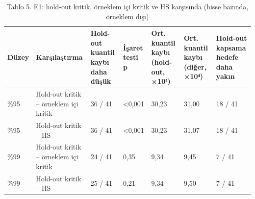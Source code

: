 \begin{table}
\caption{Tablo 5. E1: hold-out kritik, örneklem içi kritik ve HS karşısında (hisse bazında, örneklem dışı)}
\label{tab:tablo_05_e1_kritik_karsilastirma}
\begin{tabular}{lllllll}
\toprule
Düzey & Karşılaştırma & Hold-out kuantil kaybı daha düşük & İşaret testi p & Ort. kuantil kaybı (hold-out, ×10⁴) & Ort. kuantil kaybı (diğer, ×10⁴) & Hold-out kapsama hedefe daha yakın \\
\midrule
\%95 & Hold-out kritik – örneklem içi kritik & 36 / 41 & <0,001 & 30,23 & 31,00 & 18 / 41 \\
\%95 & Hold-out kritik – HS & 36 / 41 & <0,001 & 30,23 & 31,07 & 18 / 41 \\
\%99 & Hold-out kritik – örneklem içi kritik & 24 / 41 & 0,35 & 9,34 & 9,45 & 7 / 41 \\
\%99 & Hold-out kritik – HS & 25 / 41 & 0,21 & 9,34 & 9,50 & 7 / 41 \\
\bottomrule
\end{tabular}
\end{table}
